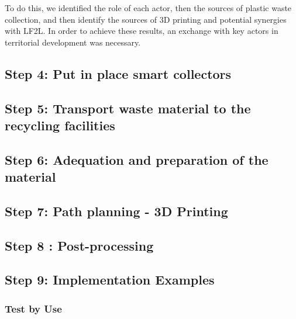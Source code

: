\documentclass[
  11pt,
]{article}
\begin{document}
To do this, we identified the role of each actor, then the sources of
plastic waste collection, and then identify the sources of 3D printing
and potential synergies with LF2L. In order to achieve these results, an
exchange with key actors in territorial development was necessary.

\hypertarget{step-4-put-in-place-smart-collectors}{%
\subsection{Step 4: Put in place smart
collectors}\label{step-4-put-in-place-smart-collectors}}

\hypertarget{step-5-transport-waste-material-to-the-recycling-facilities}{%
\subsection{Step 5: Transport waste material to the recycling
facilities}\label{step-5-transport-waste-material-to-the-recycling-facilities}}

\hypertarget{step-6-adequation-and-preparation-of-the-material}{%
\subsection{Step 6: Adequation and preparation of the
material}\label{step-6-adequation-and-preparation-of-the-material}}

\hypertarget{step-7-path-planning---3d-printing}{%
\subsection{Step 7: Path planning - 3D
Printing}\label{step-7-path-planning---3d-printing}}

\hypertarget{step-8-post-processing}{%
\subsection{Step 8 : Post-processing}\label{step-8-post-processing}}

\hypertarget{step-9-implementation-examples}{%
\subsection{Step 9: Implementation
Examples}\label{step-9-implementation-examples}}

\hypertarget{test-by-use}{%
\subsubsection{Test by Use}\label{test-by-use}}
\end{document}
